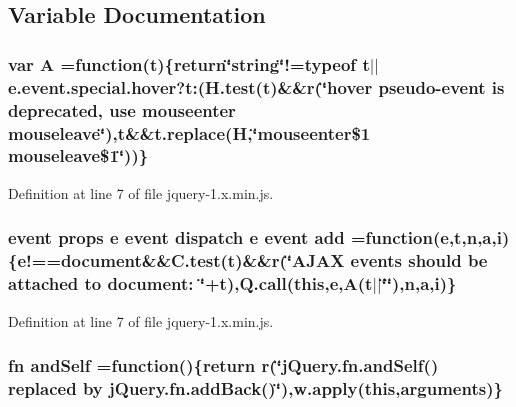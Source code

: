 \subsection{Variable Documentation}
\subsubsection[{\texorpdfstring{A}{A}}]{\setlength{\rightskip}{0pt plus 5cm}var A =function({\bf t})\{return\char`\"{}string\char`\"{}!=typeof {\bf t}$\vert$$\vert$e.\+event.\+special.\+hover?t\+:(H.\+test({\bf t})\&\&r(\char`\"{}\textquotesingle{}hover\textquotesingle{} pseudo-\/event is deprecated, use \textquotesingle{}mouseenter mouseleave\textquotesingle{}\char`\"{}),t\&\&t.\+replace({\bf H},\char`\"{}mouseenter\$1 mouseleave\$1\char`\"{}))\}}\hypertarget{jquery-1_8x_8min_8js_a9757042cb6157b0f84e78a5ff4aa6f93}{}\label{jquery-1_8x_8min_8js_a9757042cb6157b0f84e78a5ff4aa6f93}


Definition at line 7 of file jquery-\/1.\+x.\+min.\+js.

\subsubsection[{\texorpdfstring{add}{add}}]{ event props {\bf e} event dispatch {\bf e} event add =function({\bf e},{\bf t},{\bf n},{\bf a},{\bf i})\{e!=={\bf document}\&\&C.\+test({\bf t})\&\&r(\char`\"{}A\+J\+AX events should be attached to document\+: \char`\"{}+t),Q.\+call({\bf this},{\bf e},{\bf A}({\bf t}$\vert$$\vert$\char`\"{}\char`\"{}),{\bf n},{\bf a},{\bf i})\}}\hypertarget{jquery-1_8x_8min_8js_adfc2a3f1403063f39278226a02571631}{}\label{jquery-1_8x_8min_8js_adfc2a3f1403063f39278226a02571631}


Definition at line 7 of file jquery-\/1.\+x.\+min.\+js.

\subsubsection[{\texorpdfstring{and\+Self}{andSelf}}]{ {\bf fn} and\+Self =function()\{return r(\char`\"{}j\+Query.\+fn.\+and\+Self() replaced by j\+Query.\+fn.\+add\+Back()\char`\"{}),w.\+apply({\bf this},arguments)\}}\hypertarget{jquery-1_8x_8min_8js_a87feebad0d5e7f093f60e89bd1135092}{}\label{jquery-1_8x_8min_8js_a87feebad0d5e7f093f60e89bd1135092}


